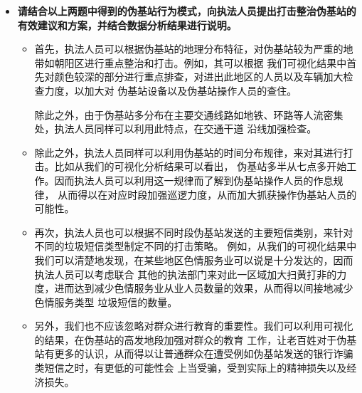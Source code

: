 \documentclass[12pt,a4paper]{article}
\begin{document}
\begin{itemize}
	

	\item \textbf{请结合以上两题中得到的伪基站行为模式，向执法人员提出打击整治伪基站的有效建议和方案，并结合数据分析结果进行说明。}
	
	\begin{itemize}
		\item 首先，执法人员可以根据伪基站的地理分布特征，对伪基站较为严重的地带如朝阳区进行重点整治和打击。例如，其可以根据
		我们可视化结果中首先对颜色较深的部分进行重点排查，对进出此地区的人员以及车辆加大检查力度，以加大对
		伪基站设备以及伪基站操作人员的查住。

		除此之外，由于伪基站多分布在主要交通线路如地铁、环路等人流密集处，执法人员同样可以利用此特点，在交通干道
		沿线加强检查。

		\item 除此之外，执法人员同样可以利用伪基站的时间分布规律，来对其进行打击。比如从我们的可视化分析结果可以看出，
		伪基站多半从七点多开始工作。因而执法人员可以利用这一规律而了解到伪基站操作人员的作息规律，
		从而得以在对应时段加强巡逻力度，从而加大抓获操作伪基站人员的可能性。

		\item 再次，执法人员也可以根据不同时段伪基站发送的主要短信类别，来针对不同的垃圾短信类型制定不同的打击策略。
		例如，从我们的可视化结果中我们可以清楚地发现，在某些地区色情服务业可以说是十分发达的，因而执法人员可以考虑联合
		其他的执法部门来对此一区域加大扫黄打非的力度，进而达到减少色情服务业从业人员数量的效果，从而得以间接地减少色情服务类型
		垃圾短信的数量。
		
		\item 另外，我们也不应该忽略对群众进行教育的重要性。我们可以利用可视化的结果，在伪基站的高发地段加强对群众的教育
		工作，让老百姓对于伪基站有更多的认识，从而得以让普通群众在遭受例如伪基站发送的银行诈骗类短信之时，有更低的可能性会
		上当受骗，受到实际上的精神损失以及经济损失。

	\end{itemize}

\end{itemize}
\end{document}
